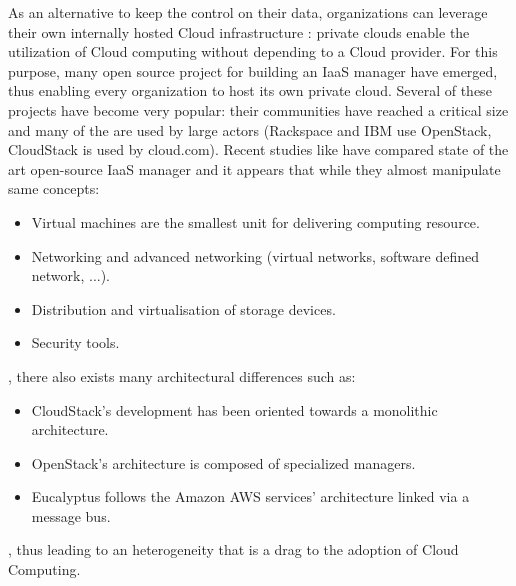 As an alternative to keep the control on their data, organizations can leverage
their own internally hosted Cloud infrastructure : private clouds enable the 
utilization of Cloud computing without depending to a Cloud provider. For this
purpose, many open source project for building an IaaS manager have emerged, 
thus enabling every organization to host its own private cloud. Several of these 
projects have become very popular: their communities have reached a critical 
size and many of the are used by large actors (Rackspace and IBM use OpenStack, 
CloudStack is used by cloud.com). Recent studies like \cite{peng:2009} have 
compared state of the art open-source IaaS manager and it appears that while 
they almost manipulate same concepts:
\begin{itemize} 
  \item Virtual machines are the smallest unit for delivering computing 
  resource.
  \item Networking and advanced networking (virtual networks, software defined 
  network, ...).
  \item Distribution and virtualisation of storage devices.
  \item Security tools.
\end{itemize} 
, there also exists many architectural differences such as:
\begin{itemize} 
  \item CloudStack's development has been oriented towards a monolithic 
  architecture.
  \item OpenStack's architecture is composed of specialized managers.
  \item Eucalyptus follows the Amazon AWS services' architecture linked via a
  message bus.
\end{itemize}, thus leading to an heterogeneity that is a drag to the adoption 
of Cloud Computing.

